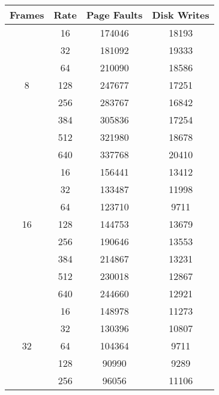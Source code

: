 \documentclass[letterpaper]{article}
\begin{document}
\begin{table}
\centering
\begin{multicols}{2}
\begin{tabular}{|c|c|c|c|}
\hline
Frames              & Rate & Page Faults & Disk Writes \\ \hline
\multirow{7}{*}{8}  & 16   & 174046      & 18193       \\ \cline{2-4} 
                    & 32   & 181092      & 19333       \\ \cline{2-4} 
                    & 64   & 210090      & 18586       \\ \cline{2-4} 
                    & 128  & 247677      & 17251       \\ \cline{2-4} 
                    & 256  & 283767      & 16842       \\ \cline{2-4} 
                    & 384  & 305836      & 17254       \\ \cline{2-4} 
                    & 512  & 321980      & 18678       \\ \cline{2-4} 
                    & 640  & 337768      & 20410       \\ \hline
\multirow{7}{*}{16} & 16   & 156441      & 13412       \\ \cline{2-4} 
                    & 32   & 133487      & 11998       \\ \cline{2-4} 
                    & 64   & 123710      & 9711        \\ \cline{2-4} 
                    & 128  & 144753      & 13679       \\ \cline{2-4} 
                    & 256  & 190646      & 13553       \\ \cline{2-4} 
                    & 384  & 214867      & 13231       \\ \cline{2-4} 
                    & 512  & 230018      & 12867       \\ \cline{2-4} 
                    & 640  & 244660      & 12921       \\ \hline
\multirow{7}{*}{32} & 16   & 148978      & 11273       \\ \cline{2-4} 
                    & 32   & 130396      & 10807       \\ \cline{2-4} 
                    & 64   & 104364      & 9711        \\ \cline{2-4} 
                    & 128  & 90990       & 9289        \\ \cline{2-4} 
                    & 256  & 96056       & 11106       \\ \cline{2-4} 

\end{tabular}
\end{multicols}
\end{table}
\end{document}
